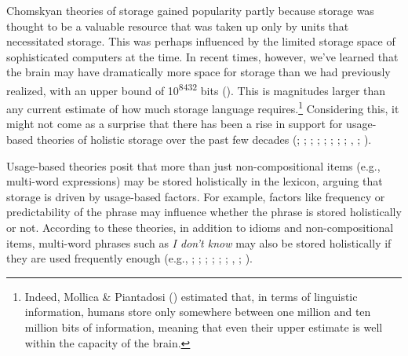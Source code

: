 \documentclass[
  12pt,
  letterpaper,
]{scrreprt}
\begin{document}
Chomskyan theories of storage gained popularity partly because storage
was thought to be a valuable resource that was taken up only by units
that necessitated storage. This was perhaps influenced by the limited
storage space of sophisticated computers at the time. In recent times,
however, we've learned that the brain may have dramatically more space
for storage than we had previously realized, with an upper bound of
10\textsuperscript{8432} bits
().
This is magnitudes larger than any current estimate of how much storage
language requires.\footnote{Indeed, Mollica \& Piantadosi
  () estimated that,
  in terms of linguistic information, humans store only somewhere
  between one million and ten million bits of information, meaning that
  even their upper estimate is well within the capacity of the brain.}
Considering this, it might not come as a surprise that there has been a
rise in support for usage-based theories of holistic storage over the
past few decades
(;
;
; ; ; ;
; ;
, ;
).

Usage-based theories posit that more than just non-compositional items
(e.g., multi-word expressions) may be stored holistically in the
lexicon, arguing that storage is driven by usage-based factors. For
example, factors like frequency or predictability of the phrase may
influence whether the phrase is stored holistically or not. According to
these theories, in addition to idioms and non-compositional items,
multi-word phrases such as \emph{I don't know} may also be stored
holistically if they are used frequently enough (e.g.,
;
;
;
;
;
;
, ;
).
\end{document}
